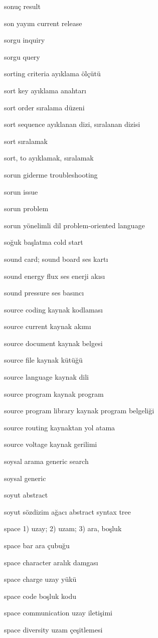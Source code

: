\documentclass[12pt,fleqn]{article}\usepackage{../../common}
\begin{document}
sonuç result

son yayım current release

sorgu inquiry

sorgu query

sorting criteria ayıklama ölçütü

sort key ayıklama anahtarı

sort order sıralama düzeni

sort sequence ayıklanan dizi, sıralanan dizisi

sort sıralamak

sort, to ayıklamak, sıralamak

sorun giderme troubleshooting

sorun issue

sorun problem

sorun yönelimli dil problem-oriented language

soğuk başlatma cold start

sound card; sound board ses kartı

sound energy flux ses enerji akısı

sound pressure ses basıncı

source coding kaynak kodlaması

source current kaynak akımı

source document kaynak belgesi

source file kaynak kütüğü

source language kaynak dili

source program kaynak program

source program library kaynak program belgeliği

source routing kaynaktan yol atama

source voltage kaynak gerilimi

soysal arama generic search

soysal generic

soyut abstract

soyut sözdizim ağacı abstract syntax tree

space 1) uzay; 2) uzam; 3) ara, boşluk

space bar ara çubuğu

space character aralık damgası

space charge uzay yükü

space code boşluk kodu

space communication uzay iletişimi

space diversity uzam çeşitlemesi
\end{document}
